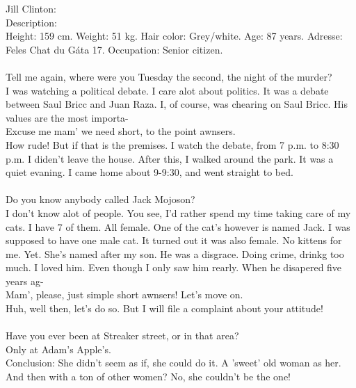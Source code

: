 \documentclass[]{article}
\begin{document}
Jill Clinton: \\
Description: \\ Height: 159 cm. Weight: 51 kg. Hair color: Grey/white. Age: 87 years. Adresse: Feles Chat du Gáta 17.  Occupation: Senior citizen.
\\ \\
Tell me again, where were you Tuesday the second, the night of the murder? \\
I was watching a political debate. I care alot about politics. It was a debate between Saul Bricc and Juan Raza. I, of course, was chearing on Saul Bricc. His values are the most importa- \\
Excuse me mam' we need short, to the point awnsers. \\
How rude! But if that is the premises. I watch the debate, from 7 p.m. to 8:30 p.m. I diden't leave the house. After this, I walked around the park. It was a quiet evaning. I came home about 9-9:30, and went straight to bed.
\\ \\
Do you know anybody called Jack Mojoson? \\
I don't know alot of people. You see, I'd rather spend my time taking care of my cats. I have 7 of them. All female. One of the cat's however is named Jack. I was supposed to have one male cat. It turned out it was also female. No kittens for me. Yet. She's named after my son. He was a disgrace. Doing crime, drinkg too much. I loved him. Even though I only saw him rearly. When he disapered five years ag- \\
Mam', please, just simple short awnsers! Let's move on. \\
Huh, well then, let's do so. But I will file a complaint about your attitude!
\\ \\
Have you ever been at Streaker street, or in that area? \\
Only at Adam's Apple's. 
\\
Conclusion: She didn't seem as if, she could do it. A 'sweet' old woman as her. And then with a ton of other women? No, she couldn't be the one!
\\ \\
\end{document}
